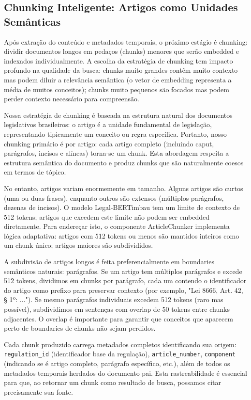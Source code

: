 \documentclass[12pt,a4paper]{article}
\begin{document}
\subsection{Chunking Inteligente: Artigos como Unidades Semânticas}

Após extração do conteúdo e metadados temporais, o próximo estágio é chunking: dividir documentos longos em pedaços (chunks) menores que serão embedded e indexados individualmente. A escolha da estratégia de chunking tem impacto profundo na qualidade da busca: chunks muito grandes contêm muito contexto mas podem diluir a relevância semântica (o vetor de embedding representa a média de muitos conceitos); chunks muito pequenos são focados mas podem perder contexto necessário para compreensão.

Nossa estratégia de chunking é baseada na estrutura natural dos documentos legislativos brasileiros: o artigo é a unidade fundamental de legislação, representando tipicamente um conceito ou regra específica. Portanto, nosso chunking primário é por artigo: cada artigo completo (incluindo caput, parágrafos, incisos e alíneas) torna-se um chunk. Esta abordagem respeita a estrutura semântica do documento e produz chunks que são naturalmente coesos em termos de tópico.

No entanto, artigos variam enormemente em tamanho. Alguns artigos são curtos (uma ou duas frases), enquanto outros são extensos (múltiplos parágrafos, dezenas de incisos). O modelo Legal-BERTimbau tem um limite de contexto de 512 tokens; artigos que excedem este limite não podem ser embedded diretamente. Para endereçar isto, o componente ArticleChunker implementa lógica adaptativa: artigos com 512 tokens ou menos são mantidos inteiros como um chunk único; artigos maiores são subdivididos.

A subdivisão de artigos longos é feita preferencialmente em boundaries semânticos naturais: parágrafos. Se um artigo tem múltiplos parágrafos e excede 512 tokens, dividimos em chunks por parágrafo, cada um contendo o identificador do artigo como prefixo para preservar contexto (por exemplo, "Lei 8666, Art. 42, § 1º: ..."). Se mesmo parágrafos individuais excedem 512 tokens (raro mas possível), subdividimos em sentenças com overlap de 50 tokens entre chunks adjacentes. O overlap é importante para garantir que conceitos que aparecem perto de boundaries de chunks não sejam perdidos.

Cada chunk produzido carrega metadados completos identificando sua origem: \texttt{regulation\_id} (identificador base da regulação), \texttt{article\_number}, \texttt{component} (indicando se é artigo completo, parágrafo específico, etc.), além de todos os metadados temporais herdados do documento pai. Esta rastreabilidade é essencial para que, ao retornar um chunk como resultado de busca, possamos citar precisamente sua fonte.
\end{document}
